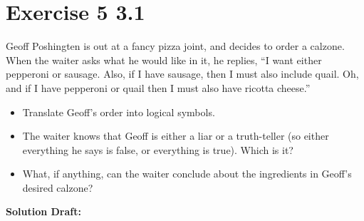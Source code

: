 \documentclass{article}
\begin{document}
\section*{Exercise 5 3.1}  

Geoff Poshingten is out at a fancy pizza joint, and decides to order a calzone. When the waiter asks what he would like in it, he replies, “I want either pepperoni or sausage. Also, if I have sausage, then I must also include quail. Oh, and if I have pepperoni or quail then I must also have ricotta cheese.”
\begin{itemize}
    \item Translate Geoff's order into logical symbols.
    \item The waiter knows that Geoff is either a liar or a truth-teller (so either everything he says is false, or everything is true). Which is it?
    \item What, if anything, can the waiter conclude about the ingredients in Geoff's desired calzone?
\end{itemize}

\vspace{0.5cm}
\noindent\textbf{Solution Draft:} 
\vspace{0.2cm}
\end{document}
